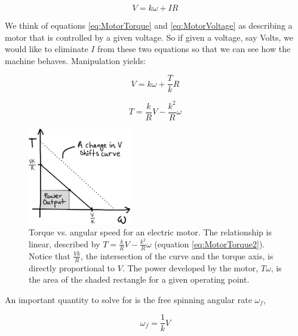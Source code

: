 \begin{equation}
V = k\omega + IR
\label{eq:MotorVoltage}
\end{equation}

We think of equations \ref{eq:MotorTorque} and \ref{eq:MotorVoltage} as describing a motor that is controlled by a given voltage. So if given a voltage, say \unit[9]{Volts}, we would like to eliminate $I$ from these two equations so that we can see how the machine behaves. Manipulation yields:

\begin{equation}
V = k\omega + \frac{T}{k}R
\label{eq:MotorVoltage2}
\end{equation}

\begin{equation}
T = \frac{k}{R}V - \frac{k^2}{R}\omega
\label{eq:MotorTorque2}
\end{equation}

\begin{figure}[h]		%
\begin{centering}
\includegraphics[width=0.4\textwidth]{Figures/MotorTorqueCurveSketch}\par
\end{centering}
\caption[Plot: Torque vs. Angular Speed for an Electric Motor]{Torque vs. angular speed for an electric motor. The relationship is linear, described by $T = \frac{k}{R}V - \frac{k^2}{R}\omega$ (equation \ref{eq:MotorTorque2}). Notice that $\frac{Vk}{R}$, the intersection of the curve and the torque axis, is directly proportional to $V$. The power developed by the motor, $T\omega$, is the area of the shaded rectangle for a given operating point.}
\label{fig:MotorTorqueCurveSketch}
\end{figure}
%

An important quantity to solve for is the free spinning angular rate $\omega_{f}$,

\begin{equation}
\omega_{f} = \frac{1}{k}V
\label{eq:FreeSpinningOmega}
\end{equation}

